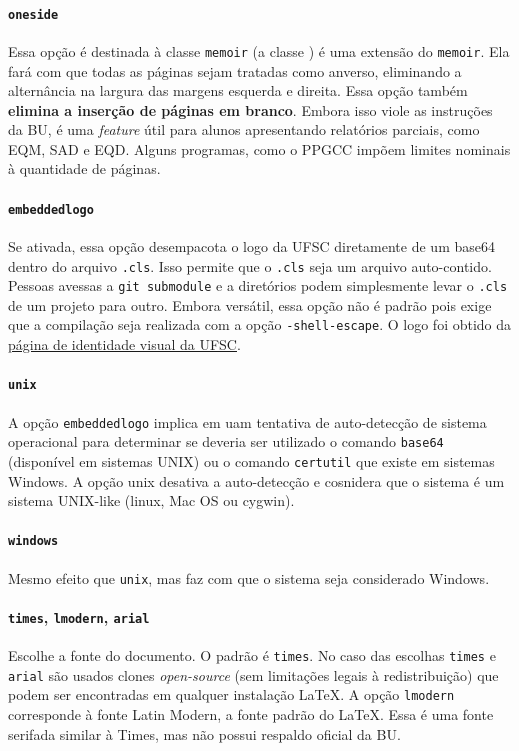 \documentclass[embeddedlogo]{ufsc-thesis-rn46-2019}
\begin{document}
\paragraph*{\texttt{oneside}} Essa opção é destinada à classe \texttt{memoir} (a
classe \abnTeX) é uma extensão do \texttt{memoir}. Ela fará com que todas as
páginas sejam tratadas como anverso, eliminando a alternância na largura das
margens esquerda e direita. Essa opção também \textbf{elimina a inserção de
  páginas em branco}. Embora isso viole as instruções da BU, é uma \emph{feature} útil
para alunos apresentando relatórios parciais, como EQM, SAD e EQD. Alguns
programas, como o PPGCC impõem limites nominais à quantidade de páginas.

\paragraph*{\texttt{embeddedlogo}} Se ativada, essa opção desempacota o logo da
UFSC diretamente de um base64 dentro do arquivo \texttt{.cls}. Isso permite que
o \texttt{.cls} seja um arquivo auto-contido. Pessoas avessas a \texttt{git
  submodule} e a diretórios podem simplesmente levar o \texttt{.cls} de um
projeto para outro. Embora versátil, essa opção não é padrão pois exige que a
compilação seja realizada com a opção \texttt{-shell-escape}. O logo foi obtido
da \href{http://identidade.ufsc.br/}{página de identidade visual da UFSC}. 

\paragraph*{\texttt{unix}} A opção \texttt{embeddedlogo} implica em uam
tentativa de auto-detecção de sistema operacional para determinar se deveria ser
utilizado o comando \texttt{base64} (disponível em sistemas UNIX) ou o comando
\texttt{certutil} que existe em sistemas Windows. A opção unix desativa a
auto-detecção e cosnidera que o sistema é um sistema UNIX-like (linux, Mac OS ou
cygwin).

\paragraph*{\texttt{windows}} Mesmo efeito que \texttt{unix}, mas faz com que o
sistema seja considerado Windows.

\paragraph*{\texttt{times}, \texttt{lmodern}, \texttt{arial}} Escolhe a fonte
do documento. O padrão é \texttt{times}. No caso das escolhas \texttt{times} e
\texttt{arial} são usados clones \emph{open-source} (sem limitações legais à
redistribuição) que podem ser encontradas em qualquer instalação \LaTeX. A
opção \texttt{lmodern} corresponde à fonte Latin Modern, a fonte padrão do
\LaTeX. Essa é uma fonte serifada similar à Times, mas não possui respaldo
oficial da BU.
\end{document}
